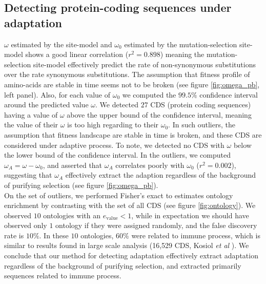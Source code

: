 \documentclass[10pt]{article}
\begin{document}
\begin{multicols}{2}
	\subsection*{Detecting protein-coding sequences under adaptation}
	$\omega$ estimated by the site-model and $\omega_{0}$ estimated by the mutation-selection site-model shows a good linear correlation ($r^2=0.898$) meaning the mutation-selection site-model effectively predict the rate of non-synonymous substitutions over the rate synonymous substitutions. The assumption that fitness profile of amino-acids are stable in time seems not to be broken (see figure \ref{fig:omega_pb}, left panel).
	Also, for each value of $\omega_{0}$ we computed the $99.5\%$ confidence interval around the predicted value $\omega$.  We detected $27$ CDS (protein coding sequences) having a value of $\omega$ above the upper bound of the confidence interval, meaning the value of their $\omega$ is too high regarding to their $\omega_{0}$. In such outliers, the assumption that fitness landscape are stable in time is broken, and these CDS are considered under adaptive process.  
	To note, we detected no CDS with $\omega$ below the lower bound of the confidence interval. 
	In the outliers, we computed  $\omega_A = \omega - \omega_0$, and asserted that $\omega_A$ correlates poorly with $ \omega_0$ ($r^2=0.002$), suggesting that $\omega_A$ effectively extract the adaption regardless of the background of purifying selection (see figure \ref{fig:omega_pb}). \\
	
	
	On the set of outliers, we performed Fisher's exact to estimates ontology enrichment by contrasting with the set of all CDS (see figure \ref{fig:ontology}). We observed $10$ ontologies with an $e_{\mathrm{value}} <1$, while in expectation we should have observed only $1$ ontology if they were assigned randomly, and the false discovery rate is $10 \%$. In these $10$ ontologies, $60 \%$ were related to immune process, which is similar to results found in large scale analysis (16,529 CDS, Kosiol \textit{et al} \cite{kosiol_patterns_2008}). We conclude that our method for detecting adaptation effectively extract adaptation regardless of the background of purifying selection, and extracted primarily sequences related to immune process. \\
	
			\end{multicols}
\end{document}
